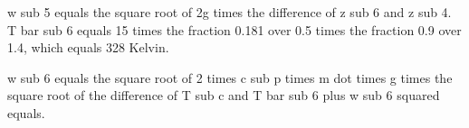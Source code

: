 w sub 5 equals the square root of 2g times the difference of z sub 6 and z sub 4. T bar sub 6 equals 15 times the fraction 0.181 over 0.5 times the fraction 0.9 over 1.4, which equals 328 Kelvin.

w sub 6 equals the square root of 2 times c sub p times m dot times g times the square root of the difference of T sub c and T bar sub 6 plus w sub 6 squared equals.